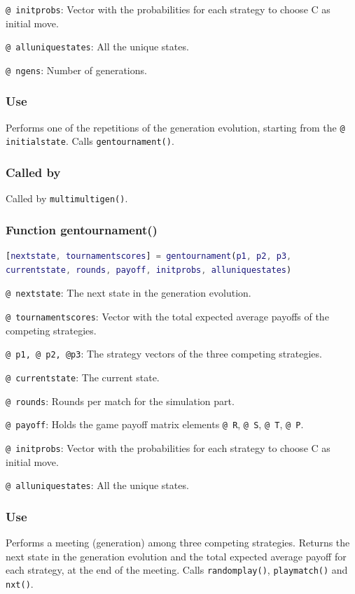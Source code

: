 \documentclass[12pt]{report}
\begin{document}
\texttt{@ initprobs}: Vector with the probabilities for each strategy to choose C as  initial move.

\texttt{@ alluniquestates}: All the unique states.

\texttt{@ ngens}: Number of generations.

\subsubsection*{Use }
Performs one of the repetitions of the generation evolution, starting from the \texttt{@ initialstate}. Calls \texttt{gentournament()}.

\subsubsection*{Called by}
Called by \texttt{multimultigen()}.








\subsubsection*{Function gentournament()}

\begin{lstlisting}[language=Matlab]
[nextstate, tournamentscores] = gentournament(p1, p2, p3,
currentstate, rounds, payoff, initprobs, alluniquestates)

\end{lstlisting}

\texttt{@ nextstate}: The next state in the generation evolution.

 \texttt{@ tournamentscores}: Vector with the total expected average payoffs of the competing strategies.

\texttt{@ p1, @ p2, @p3}: The strategy vectors of the three competing strategies.

\texttt{@ currentstate}: The current state.

\texttt{@ rounds}: Rounds per match for the simulation part.

\texttt{@ payoff}: Holds the game payoff matrix elements \texttt{@ R}, \texttt{@ S}, \texttt{@ T}, \texttt{@ P}. 

\texttt{@ initprobs}: Vector with the probabilities for each strategy to choose C as  initial move.

\texttt{@ alluniquestates}: All the unique states.

\subsubsection*{Use }
Performs a meeting (generation) among three competing strategies. Returns the next state in the generation evolution and the total expected average payoff for each strategy, at the end of the meeting. Calls \texttt{randomplay()}, \texttt{playmatch()} and \texttt{nxt()}. 
\end{document}
